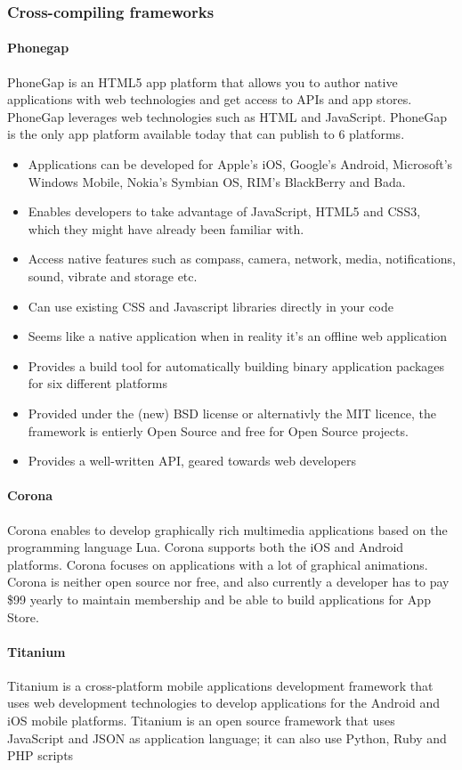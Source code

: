 \subsubsection{Cross-compiling frameworks}
\paragraph{\bf{Phonegap}}
PhoneGap is an HTML5 app platform that allows you to author native applications with web technologies and get access to APIs and app stores. PhoneGap leverages web technologies such as HTML and JavaScript. PhoneGap is the only app platform available today that can publish to 6 platforms.
\cite{phonegap:about}
	\begin{itemize}
		\item Applications can be developed for Apple’s iOS, Google’s Android,
		Microsoft’s Windows Mobile, Nokia’s Symbian OS, RIM’s BlackBerry and Bada.
		\item Enables developers to take advantage of JavaScript, HTML5 and CSS3,
		which they might have already been familiar with.
		\item Access native features such as compass, camera, network, media,
		notifications, sound, vibrate and storage etc.
    \item Can use existing CSS and Javascript libraries directly in your code
    \item Seems like a native application when in reality it's an offline web application
    \item Provides a build tool for automatically building binary application packages for six different platforms
    \item Provided under the (new) BSD license or alternativly the MIT licence, the framework is entierly Open Source and free for Open Source projects.
    \item Provides a well-written API, geared towards web developers
	\end{itemize}

\paragraph{Corona}
Corona enables to develop graphically rich multimedia applications based on the programming
language Lua\cite{corona:about}. Corona supports both the iOS and Android platforms. Corona focuses on
applications with a lot of graphical animations. Corona is neither open source nor free, and also currently a developer
has to pay \$99 yearly to maintain membership and be able to build applications for App Store.

\paragraph{Titanium}
Titanium is a cross-platform mobile applications development framework that uses web
development technologies to develop applications for the Android and iOS mobile platforms.
Titanium is an open source framework that uses JavaScript and JSON as application language;
it can also use Python, Ruby and PHP scripts\cite{titanium:about}
